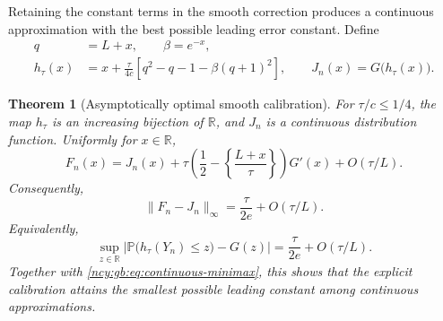 \documentclass[11pt,letterpaper]{article}
\numberwithin{equation}{section}
\newtheorem{theorem}{Theorem}[section]
\theoremstyle{remark}\newtheorem{remark}[theorem]{Remark}
\theoremstyle{definition}\newtheorem{definition}[theorem]{Definition}\theoremstyle{plain}
\newcommand{\Pbb}{\mathbb P}
\newcommand{\R}{\mathbb R}
\begin{document}
Retaining the constant terms in the smooth correction produces a
continuous approximation with the best possible leading error
constant.  Define
\begin{equation}
\label{ncy:gb:eq:full-calibration}
 \begin{split}
 q&=L+x,\qquad \beta=e^{-x},\\
 h_\tau(x)
  &=x+\frac{\tau}{4c}
       \left[q^2-q-1-\beta(q+1)^2\right],\qquad
 J_n(x)=G\bigl(h_\tau(x)\bigr).
 \end{split}
\end{equation}

\begin{theorem}[Asymptotically optimal smooth calibration]
\label{ncy:gb:thm:optimal}
For $\tau/c\le1/4$, the map $h_\tau$ is an increasing bijection of
$\R$, and $J_n$ is a continuous distribution function.
Uniformly for $x\in\R$,
\begin{equation}
\label{ncy:gb:eq:calibrated-lattice-expansion}
 F_n(x)=J_n(x)
   +\tau\left(\frac12-
       \left\{\frac{L+x}{\tau}\right\}\right)G'(x)
   +O(\tau/L).
\end{equation}
Consequently,
\begin{equation}
\label{ncy:gb:eq:optimal-calibration-distance}
 \|F_n-J_n\|_\infty
  =\frac{\tau}{2e}+O(\tau/L).
\end{equation}
Equivalently,
\[
 \sup_{z\in\R}
 \left|\Pbb\bigl(h_\tau(Y_n)\le z\bigr)-G(z)\right|
 =\frac{\tau}{2e}+O(\tau/L).
\]
Together with \eqref{ncy:gb:eq:continuous-minimax}, this shows that the
explicit calibration attains the smallest possible leading constant
among continuous approximations.
\end{theorem}
\end{document}
